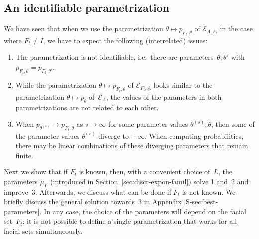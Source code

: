 \documentclass[aos,noinfoline]{imsart}
\newcommand{\Ecal}{\mathcal{E}}
\theoremstyle{remark}
\theoremstyle{definition}
\begin{document}
\subsection{An identifiable parametrization}
\label{sec:param-trafos}

We have seen that when we use the parametrization $\theta\mapsto p_{F_{t},\theta}$ of $\Ecal_{A,F_{t}}$ in the case
where $F_{t}\neq I$, we have to expect the following (interrelated) issues:
\begin{enumerate}
\item The parametrization is not identifiable, i.e.~there are parameters~$\theta,\theta'$ with $p_{F_{t},\theta}=p_{F_{t},\theta'}$.
\item While the parametrization $\theta\mapsto p_{F_{t},\theta}$ of $\Ecal_{F_{t},A}$ looks similar to the parametrization $\theta\mapsto
  p_{\theta}$ of~$\Ecal_{A}$, the values of the parameters in both parametrizations are not related to each other.
\item When $p_{\theta^{(s)}}\to p_{F_{t},\theta}$ as $s\to\infty$ for some parameter values $\theta^{(s)},\theta$, then
  some of the parameter values $\theta^{(s)}$ diverge to~$\pm\infty$.  When computing probabilities, there may be
  linear combinations of these diverging parameters that remain finite.
\end{enumerate}
Next we show that if $F_{t}$ is known, then, with a convenient choice of~$L$, the parameters $\mu_{L}$ (introduced in
Section~\ref{sec:discr-expon-famil}) solve 1 and~2 and improve~3.  Afterwards, we discuss what can be done if $F_{t}$
is not known.  We briefly discuss the general solution towards~3 in Appendix \ref{S-sec:best-parameters}.
In any case, the choice of the parameters will depend on the facial set~$F_{t}$:  it is not possible to define a
single parametrization that works for all facial sets simultaneously.
\end{document}
